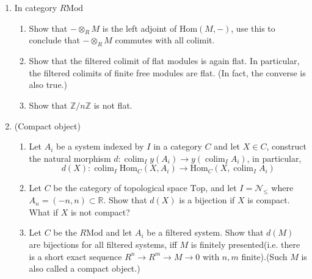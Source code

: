 \documentclass[a4paper,11pt]{article}
\def\bb#1{\mathbb{#1}}
\def\bZ{\mathbb{Z}}
\def\Zmd#1{\bZ/#1\bZ}
\def\mrm#1{\mathrm{#1}}
\def\Hom{\mathrm{Hom}}
\def\Mod#1{#1\mathrm{Mod}}
\DeclareMathOperator{\colim}{colim}
\begin{document}
\begin{enumerate}[1.]
\item In category $\Mod{R}$
\begin{enumerate}
    \item Show that $-\otimes_R M$ is the left adjoint of $\Hom(M,-)$, use this to conclude that $-\otimes_R M$ commutes with all colimit.
    \item Show that the filtered colimit of flat modules is again flat. In particular, the filtered colimits of finite free modules are flat. (In fact, the converse is also true.)
    \item Show that $\Zmd{n}$ is not flat.
\end{enumerate}
\item (Compact object)
\begin{enumerate}
    \item Let $A_i$ be a system indexed by $I$ in a category $C$ and let $X\in C$, construct the natural morphism $d: \colim_I y(A_i)\to  y( \colim_I A_i) $, in particular, \[d(X):\colim_I\Hom_C(X,A_i) \to \Hom_C(X,\colim_I A_i) \]
    \item Let $C$ be the category of topological space $\mrm{Top}$, and let $I=\mathcal{N}_{\leq}$ where $A_n=(-n,n) \subset  \bb{R}$. Show that $d(X)$ is a bijection if $X$ is compact. What if $X$ is not compact?
    \item Let $C$ be the $\Mod{R}$ and let $A_i$ be a filtered system. Show that $d(M)$ are bijections for all filtered systems, iff $M$ is finitely presented(i.e. there is a short exact sequence $R^n\to R^m\to M\to 0$ with $n,m$ finite).(Such $M$ is also called a compact object.)
\end{enumerate}


\end{enumerate}
\end{document}
